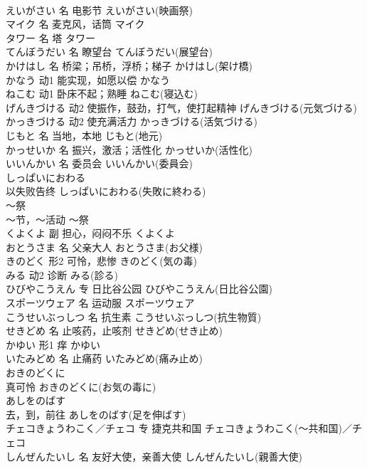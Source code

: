 \documentclass[8pt]{extreport}
\begin{document}
\begin{CJK}{UTF8}{min}
\\	えいがさい	名	电影节	えいがさい(映画祭)	
\\	マイク	名	麦克风，话筒	マイク	
\\	タワー	名	塔	タワー	
\\	てんぼうだい	名	瞭望台	てんぼうだい(展望台)	
\\	かけはし	名	桥梁；吊桥，浮桥；梯子	かけはし(架け橋)	
\\	かなう	动1	能实现，如愿以偿	かなう	
\\	ねこむ	动1	卧床不起；熟睡	ねこむ(寝込む)	
\\	げんきづける	动2	使振作，鼓劲，打气，使打起精神	げんきづける(元気づける)	
\\	かっきづける	动2	使充满活力	かっきづける(活気づける)	
\\	じもと	名	当地，本地	じもと(地元)	
\\	かっせいか	名	振兴，激活；活性化	かっせいか(活性化)	
\\	いいんかい	名	委员会	いいんかい(委員会)	
\\	しっぱいにおわる	
\\	以失败告终	しっぱいにおわる(失敗に終わる)	
\\	～祭	
\\	～节，～活动	～祭	
\\	くよくよ	副	担心，闷闷不乐	くよくよ	
\\	おとうさま	名	父亲大人	おとうさま(お父様)	
\\	きのどく	形2	可怜，悲惨	きのどく(気の毒)	
\\	みる	动2	诊断	みる(診る)	
\\	ひびやこうえん	专	日比谷公园	ひびやこうえん(日比谷公園)	
\\	スポーツウェア	名	运动服	スポーツウェア	
\\	こうせいぶっしつ	名	抗生素	こうせいぶっしつ(抗生物質)	
\\	せきどめ	名	止咳药，止咳剂	せきどめ(せき止め)	
\\	かゆい	形1	痒	かゆい	
\\	いたみどめ	名	止痛药	いたみどめ(痛み止め)	
\\	おきのどくに	
\\	真可怜	おきのどくに(お気の毒に)	
\\	あしをのばす	
\\	去，到，前往	あしをのばす(足を伸ばす)	
\\	チェコきょうわこく／チェコ	专	捷克共和国	チェコきょうわこく(～共和国)／チェコ	
\\	しんぜんたいし	名	友好大使，亲善大使	しんぜんたいし(親善大使)	

\end{CJK}
\end{document}
